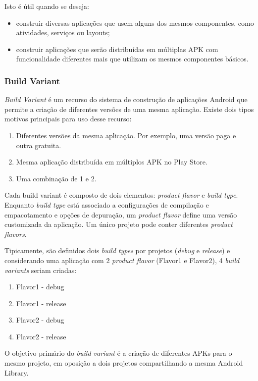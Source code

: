 Isto é útil quando se deseja:
\begin{itemize}
    \item construir diversas aplicações que usem alguns dos mesmos componentes,
        como atividades, serviços ou layouts;
    \item construir aplicações que serão distribuídas em múltiplas APK com
        funcionalidade diferentes mais que utilizam os mesmos componentes básicos.
\end{itemize}

\subsubsection{Build Variant}
\textit{Build Variant} é um recurso do sistema de construção de aplicações Android
que permite a criação de diferentes versões de uma mesma aplicação. Existe dois
tipos motivos principais para uso desse recurso:
\begin{enumerate}
    \item Diferentes versões da mesma aplicação. Por exemplo, uma versão paga e
        outra gratuita.
    \item Mesma aplicação distribuída em múltiplos APK no Play Store.
    \item Uma combinação de 1 e 2.
\end{enumerate}

Cada build variant é composto de dois elementos: \textit{product flavor} e
\textit{build type}. Enquanto \textit{build type} está associado a configurações
de compilação e empacotamento e opções de depuração, um \textit{product flavor}
define uma versão customizada da aplicação. Um único projeto pode conter
diferentes \textit{product flavors}.

Tipicamente, são definidos dois \textit{build types} por projetos (\textit{debug}
e \textit{release}) e
considerando uma aplicação com 2 \textit{product flavor} (Flavor1 e Flavor2),
4 \textit{build variants} seriam criadas:
\begin{enumerate}
    \item Flavor1 - debug
    \item Flavor1 - release
    \item Flavor2 - debug
    \item Flavor2 - release
\end{enumerate}

O objetivo primário do \textit{build variant} é a criação de diferentes APKs
para o mesmo projeto, em oposição a dois projetos compartilhando a mesma Android Library.

